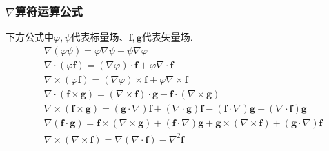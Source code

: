 \documentclass[main.tex]{subfiles}
\begin{document}
\subsubsection{$\nabla $算符运算公式}
下方公式中$\varphi ,\psi $代表标量场、$\boldsymbol{f},\boldsymbol{g}$代表矢量场.
\begin{align}
    &\nabla (\varphi \psi ) = \varphi \nabla \psi + \psi \nabla \varphi\\
    &\nabla \cdot (\varphi \boldsymbol{f}) = (\nabla \varphi )\cdot \boldsymbol{f} + \varphi \nabla \cdot \boldsymbol{f}\\
    &\nabla \times (\varphi \boldsymbol{f}) = (\nabla \varphi )\times \boldsymbol{f} + \varphi \nabla \times \boldsymbol{f}\\
    \label{nabla4}&\nabla \cdot (\boldsymbol{f}\times \boldsymbol{g}) = (\nabla \times \boldsymbol{f})\cdot \boldsymbol{g} - \boldsymbol{f} \cdot (\nabla \times \boldsymbol{g})\\
    &\nabla \times (\boldsymbol{f} \times \boldsymbol{g}) = (\boldsymbol{g} \cdot \nabla) \boldsymbol{f}+(\nabla \cdot \boldsymbol{g})\boldsymbol{f}-(\boldsymbol{f} \cdot \nabla)\boldsymbol{g} - (\nabla \cdot \boldsymbol{f})\boldsymbol{g}\\
    &\nabla(\boldsymbol{f}\cdot \boldsymbol{g}) = \boldsymbol{f}\times (\nabla \times \boldsymbol{g}) + (\boldsymbol{f} \cdot \nabla )\boldsymbol{g} + \boldsymbol{g}\times (\nabla \times \boldsymbol{f})+(\boldsymbol{g} \cdot \nabla)\boldsymbol{f}\\
    \label{nabla7}&\nabla \times (\nabla \times \boldsymbol{f}) = \nabla (\nabla \cdot \boldsymbol{f}) - \nabla ^2 \boldsymbol{f}
\end{align}
\end{document}
